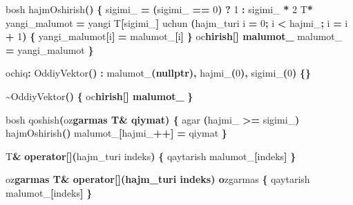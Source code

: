 \documentclass[a4paper,11pt,twoside,openright]{book}
\newenvironment{Shaded}{\begin{snugshade}}{\end{snugshade}}
\newcommand{\CharTok}[1]{\textcolor[rgb]{0.31,0.60,0.02}{#1}}
\newcommand{\DecValTok}[1]{\textcolor[rgb]{0.00,0.00,0.81}{#1}}
\newcommand{\ErrorTok}[1]{\textcolor[rgb]{0.64,0.00,0.00}{\textbf{#1}}}
\newcommand{\KeywordTok}[1]{\textcolor[rgb]{0.13,0.29,0.53}{\textbf{#1}}}
\newcommand{\NormalTok}[1]{#1}
\newcommand{\OperatorTok}[1]{\textcolor[rgb]{0.81,0.36,0.00}{\textbf{#1}}}
\newcommand{\VariableTok}[1]{\textcolor[rgb]{0.00,0.00,0.00}{#1}}
\begin{document}
\begin{Shaded}
\begin{Highlighting}[]
\NormalTok{    bosh hajmOshirish}\OperatorTok{()} \OperatorTok{\{}
        \VariableTok{sigimi\_} \OperatorTok{=} \OperatorTok{(}\VariableTok{sigimi\_} \OperatorTok{==} \DecValTok{0}\OperatorTok{)} \OperatorTok{?} \DecValTok{1} \OperatorTok{:} \VariableTok{sigimi\_} \OperatorTok{*} \DecValTok{2}
\NormalTok{        T}\OperatorTok{*}\NormalTok{ yangi\_malumot }\OperatorTok{=}\NormalTok{ yangi T}\OperatorTok{[}\VariableTok{sigimi\_}\OperatorTok{]}
\NormalTok{        uchun }\OperatorTok{(}\NormalTok{hajm\_turi i }\OperatorTok{=} \DecValTok{0}\OperatorTok{;}\NormalTok{ i }\OperatorTok{\textless{}} \VariableTok{hajmi\_}\OperatorTok{;}\NormalTok{ i }\OperatorTok{=}\NormalTok{ i }\OperatorTok{+} \DecValTok{1}\OperatorTok{)} \OperatorTok{\{}
\NormalTok{            yangi\_malumot}\OperatorTok{[}\NormalTok{i}\OperatorTok{]} \OperatorTok{=} \VariableTok{malumot\_}\OperatorTok{[}\NormalTok{i}\OperatorTok{]}
        \OperatorTok{\}}
\NormalTok{        o}\CharTok{\textquotesingle{}c}\ErrorTok{hirish[] malumot\_}
        \VariableTok{malumot\_} \OperatorTok{=}\NormalTok{ yangi\_malumot}
    \OperatorTok{\}}

\NormalTok{ochiq}\OperatorTok{:}
\NormalTok{    OddiyVektor}\OperatorTok{()} \OperatorTok{:} \VariableTok{malumot\_}\OperatorTok{(}\KeywordTok{nullptr}\OperatorTok{),} \VariableTok{hajmi\_}\OperatorTok{(}\DecValTok{0}\OperatorTok{),} \VariableTok{sigimi\_}\OperatorTok{(}\DecValTok{0}\OperatorTok{)} \OperatorTok{\{\}}

    \OperatorTok{\textasciitilde{}}\NormalTok{OddiyVektor}\OperatorTok{()} \OperatorTok{\{}
\NormalTok{        o}\CharTok{\textquotesingle{}c}\ErrorTok{hirish[] malumot\_}
    \OperatorTok{\}}

\NormalTok{    bosh qoshish}\OperatorTok{(}\NormalTok{o}\CharTok{\textquotesingle{}z}\ErrorTok{garmas T\& qiymat) \{}
\NormalTok{        agar }\OperatorTok{(}\VariableTok{hajmi\_} \OperatorTok{\textgreater{}=} \VariableTok{sigimi\_}\OperatorTok{)}\NormalTok{ hajmOshirish}\OperatorTok{()}
        \VariableTok{malumot\_}\OperatorTok{[}\VariableTok{hajmi\_}\OperatorTok{++]} \OperatorTok{=}\NormalTok{ qiymat}
    \OperatorTok{\}}

\NormalTok{    T}\OperatorTok{\&} \KeywordTok{operator}\OperatorTok{[](}\NormalTok{hajm\_turi indeks}\OperatorTok{)} \OperatorTok{\{}\NormalTok{ qaytarish }\VariableTok{malumot\_}\OperatorTok{[}\NormalTok{indeks}\OperatorTok{]} \OperatorTok{\}}

\NormalTok{    o}\CharTok{\textquotesingle{}z}\ErrorTok{garmas T\& operator[](hajm\_turi indeks) o}\CharTok{\textquotesingle{}}\NormalTok{zgarmas }\OperatorTok{\{}
\NormalTok{        qaytarish }\VariableTok{malumot\_}\OperatorTok{[}\NormalTok{indeks}\OperatorTok{]}
    \OperatorTok{\}}


\end{Highlighting}
\end{Shaded}
\end{document}
